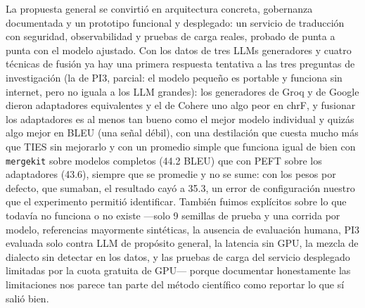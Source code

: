 \documentclass[11pt,a4paper]{article}
\begin{document}
La propuesta general se convirtió en arquitectura concreta, gobernanza documentada y un prototipo funcional y desplegado: un servicio de traducción con seguridad, observabilidad y pruebas de carga reales, probado de punta a punta con el modelo ajustado. Con los datos de tres LLMs generadores y cuatro técnicas de fusión ya hay una primera respuesta tentativa a las tres preguntas de investigación (la de PI3, parcial: el modelo pequeño es portable y funciona sin internet, pero no iguala a los LLM grandes): los generadores de Groq y de Google dieron adaptadores equivalentes y el de Cohere uno algo peor en chrF, y fusionar los adaptadores es al menos tan bueno como el mejor modelo individual y quizás algo mejor en BLEU (una señal débil), con una destilación que cuesta mucho más que TIES sin mejorarlo y con un promedio simple que funciona igual de bien con \texttt{mergekit} sobre modelos completos (44.2 BLEU) que con PEFT sobre los adaptadores (43.6), siempre que se promedie y no se sume: con los pesos por defecto, que sumaban, el resultado cayó a 35.3, un error de configuración nuestro que el experimento permitió identificar. También fuimos explícitos sobre lo que todavía no funciona o no existe ---solo 9 semillas de prueba y una corrida por modelo, referencias mayormente sintéticas, la ausencia de evaluación humana, PI3 evaluada solo contra LLM de propósito general, la latencia sin GPU, la mezcla de dialecto sin detectar en los datos, y las pruebas de carga del servicio desplegado limitadas por la cuota gratuita de GPU--- porque documentar honestamente las limitaciones nos parece tan parte del método científico como reportar lo que sí salió bien.
\end{document}
